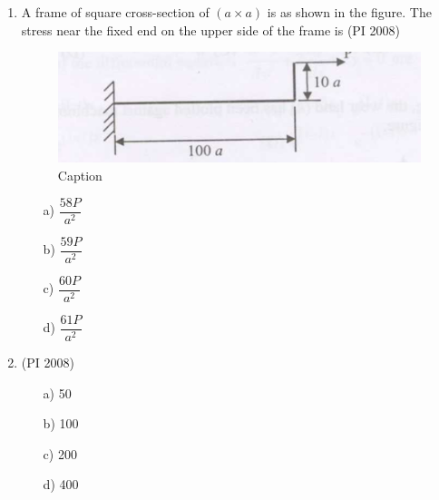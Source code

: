 \documentclass[journal,12pt,onecolumn]{IEEEtran}
\theoremstyle{remark}
\begin{document}
\begin{enumerate}
\item %
A frame of square cross-section of $(a \times a)$ is as shown in the figure. The stress near the fixed end on the upper side of the frame is  \hfill{(PI 2008)}

\begin{figure}[h]
    \centering
    \includegraphics[width=0.5\linewidth]{figures/GATE-pi-2008-56.png}
    \caption{Caption}
    \label{q56}
\end{figure}

\begin{multicols}{4}
    \begin{enumerate}
\item[a)] $\dfrac{58P}{a^2}$
\item[b)] $\dfrac{59P}{a^2}$
\item[c)] $\dfrac{60P}{a^2}$
\item[d)] $\dfrac{61P}{a^2}$
\end{enumerate}
\end{multicols}
\vspace{1cm}
\item %
\hfill{(PI 2008)}
\begin{multicols}{4}
    \begin{enumerate}
\item[a)] 50
\item[b)] 100
\item[c)] 200
\item[d)] 400
\end{enumerate}
\end{multicols}
\vspace{1cm}


\end{enumerate}
\end{document}
